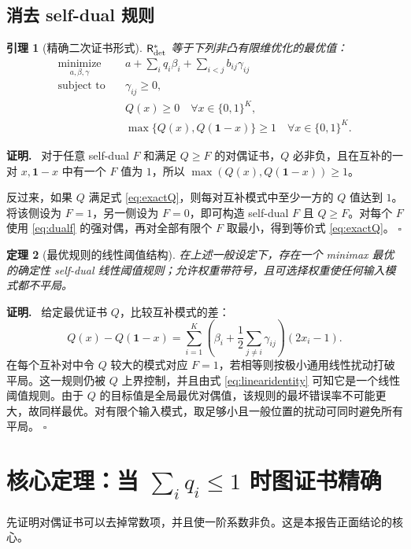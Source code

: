 \documentclass[11pt,a4paper]{ctexart}
\newtheorem{theorem}{定理}[section]
\newtheorem{lemma}[theorem]{引理}
\theoremstyle{definition}
\newenvironment{proofcn}{\par\noindent\textbf{证明.}\ }{\hfill $\square$\par}
\newcommand{\one}{\mathbf 1}
\newcommand{\Risk}{\mathsf R}
\begin{document}
\subsection{消去 self-dual 规则}
\begin{lemma}[精确二次证书形式]\label{lem:Q}
$\Risk^*_{\rm det}$ 等于下列非凸有限维优化的最优值：
\begin{equation}\label{eq:exactQ}
\begin{aligned}
\underset{a,\beta,\gamma}{\operatorname{minimize}}\quad &a+\sum_iq_i\beta_i+\sum_{i<j}b_{ij}\gamma_{ij}\\
\text{subject to}\quad &\gamma_{ij}\ge0,\\
&Q(x)\ge0\quad\forall x\in\{0,1\}^K,\\
&\max\{Q(x),Q(\one-x)\}\ge1\quad\forall x\in\{0,1\}^K.
\end{aligned}
\end{equation}
\end{lemma}
\begin{proofcn}
对于任意 self-dual $F$ 和满足 $Q\ge F$ 的对偶证书，$Q$ 必非负，且在互补的一对 $x,\one-x$ 中有一个 $F$ 值为 $1$，所以 $\max(Q(x),Q(\one-x))\ge1$。

反过来，如果 $Q$ 满足式 \eqref{eq:exactQ}，则每对互补模式中至少一方的 $Q$ 值达到 $1$。将该侧设为 $F=1$，另一侧设为 $F=0$，即可构造 self-dual $F$ 且 $Q\ge F$。对每个 $F$ 使用 \eqref{eq:dualf} 的强对偶，再对全部有限个 $F$ 取最小，得到等价式 \eqref{eq:exactQ}。
\end{proofcn}

\begin{theorem}[最优规则的线性阈值结构]\label{thm:linear}
在上述一般设定下，存在一个 minimax 最优的确定性 self-dual 线性阈值规则；允许权重带符号，且可选择权重使任何输入模式都不平局。
\end{theorem}
\begin{proofcn}
给定最优证书 $Q$，比较互补模式的差：
\begin{equation}\label{eq:linearidentity}
Q(x)-Q(\one-x)=\sum_{i=1}^K\left(\beta_i+\frac12\sum_{j\ne i}\gamma_{ij}\right)(2x_i-1).
\end{equation}
在每个互补对中令 $Q$ 较大的模式对应 $F=1$，若相等则按极小通用线性扰动打破平局。这一规则仍被 $Q$ 上界控制，并且由式 \eqref{eq:linearidentity} 可知它是一个线性阈值规则。由于 $Q$ 的目标值是全局最优对偶值，该规则的最坏错误率不可能更大，故同样最优。对有限个输入模式，取足够小且一般位置的扰动可同时避免所有平局。
\end{proofcn}

\section{核心定理：当 $\sum_iq_i\le1$ 时图证书精确}
先证明对偶证书可以去掉常数项，并且使一阶系数非负。这是本报告正面结论的核心。
\end{document}
